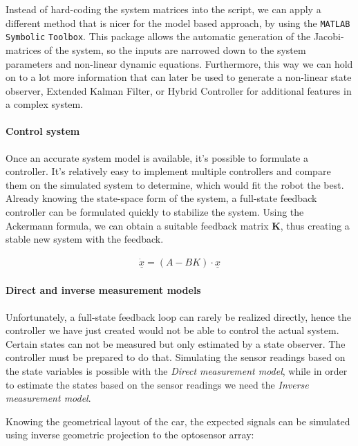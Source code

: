 Instead of hard-coding the system matrices into the script, we can apply a different method that is nicer for the model based approach, by using the \verb!MATLAB! \verb!Symbolic! \verb!Toolbox!. This package allows the automatic generation of the Jacobi-matrices of the system, so the inputs are narrowed down to the system parameters and non-linear dynamic equations.
Furthermore, this way we can hold on to a lot more information that can later be used to generate a non-linear state observer, Extended Kalman Filter\cite{ekf}, or Hybrid Controller\cite{hybrid} for additional features in a complex system.
     


\paragraph{Control system}

Once an accurate system model is available, it's possible to formulate a controller. It's relatively easy to implement multiple controllers and compare them on the simulated system to determine, which would fit the robot the best.
Already knowing the state-space form of the system, a full-state feedback controller can be formulated quickly to stabilize the system. Using the Ackermann formula, we can obtain a suitable feedback matrix \textbf{K}, thus creating a stable new system with the feedback.

\begin{align}
	\underline{\dot{x}} = (A - BK) \cdot \underline{x}
\end{align}

\paragraph{Direct and inverse measurement models}

Unfortunately, a full-state feedback loop can rarely be realized directly, hence the controller we have just created would not be able to control the actual system. Certain states can not be measured but only estimated by a state observer. The controller must be prepared to do that. Simulating the sensor readings based on the state variables is possible with the \emph{Direct measurement model}, while in order to estimate the states based on the sensor readings we need the \emph{Inverse measurement model}.

Knowing the geometrical layout of the car, the expected signals can be simulated using inverse geometric projection to the optosensor array:

